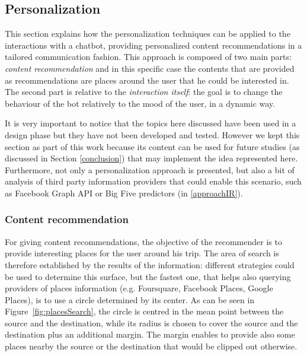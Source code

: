 \subsection{Personalization}
\label{approachPersonalization}

This section explains how the personalization techniques can be applied to the interactions with a chatbot, providing personalized content recommendations in a tailored communication fashion. This approach is composed of two main parts: \textit{content recommendation} and in this specific case the contents that are provided as recommendations are places around the user that he could be interested in. The second part is relative to the \textit{interaction itself}: the goal is to change the behaviour of the bot relatively to the mood of the user, in a dynamic way.

It is very important to notice that the topics here discussed have been used in a design phase but they have not been developed and tested. However we kept this section as part of this work because its content can be used for future studies (as discussed in Section \ref{conclusion}) that may implement the idea represented here. Furthermore, not only a personalization approach is presented, but also a bit of analysis of third party information providers that could enable this scenario, such as Facebook Graph API or Big Five predictors (in \ref{approachIR}).

\subsubsection{Content recommendation}
\label{approachRec}

For giving content recommendations, the objective of the recommender is to provide interesting places for the user around his trip. The area of search is therefore established by the results of the information: different strategies could be used to determine this surface, but the fastest one, that helps also querying providers of places information (e.g. Foursquare, Facebook Places, Google Places), is to use a circle determined by its center. As can be seen in Figure~\ref{fig:placesSearch}, the circle is centred in the mean point between the source and the destination, while its radius is chosen to cover the source and the destination plus an additional margin. The margin enables to provide also some places nearby the source or the destination that would be clipped out otherwise.


